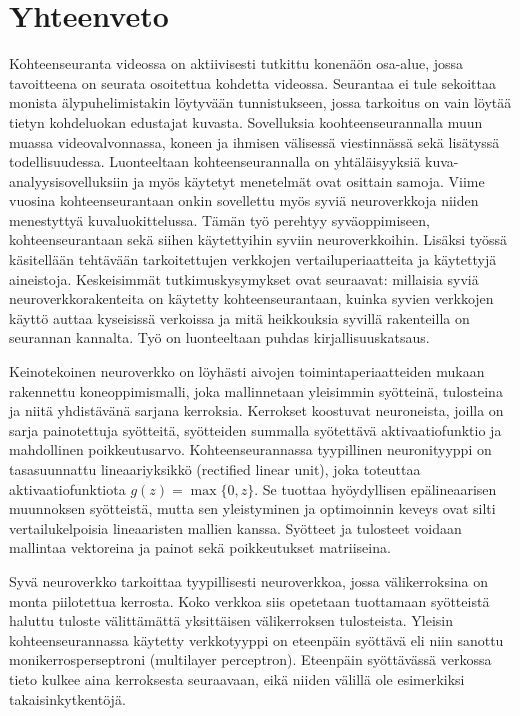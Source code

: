 \clearpage
\section*{Yhteenveto}
Kohteenseuranta videossa on aktiivisesti tutkittu konenäön osa-alue, jossa tavoitteena
on seurata osoitettua kohdetta videossa. Seurantaa ei tule sekoittaa monista älypuhelimistakin
löytyvään tunnistukseen, jossa tarkoitus on vain löytää tietyn kohdeluokan edustajat
kuvasta. Sovelluksia koohteenseurannalla muun muassa videovalvonnassa, koneen ja ihmisen
välisessä viestinnässä sekä lisätyssä todellisuudessa. Luonteeltaan kohteenseurannalla on
yhtäläisyyksiä kuva-analyysisovelluksiin ja myös käytetyt menetelmät ovat osittain samoja.
Viime vuosina kohteenseurantaan onkin sovellettu myös syviä neuroverkkoja niiden menestyttyä
kuvaluokittelussa. Tämän työ perehtyy syväoppimiseen, kohteenseurantaan sekä siihen
käytettyihin syviin neuroverkkoihin. Lisäksi työssä käsitellään tehtävään tarkoitettujen
verkkojen vertailuperiaatteita ja käytettyjä aineistoja. Keskeisimmät tutkimuskysymykset
ovat seuraavat: millaisia syviä neuroverkkorakenteita on käytetty kohteenseurantaan, kuinka
syvien verkkojen käyttö auttaa kyseisissä verkoissa ja mitä heikkouksia syvillä rakenteilla
on seurannan kannalta. Työ on luonteeltaan puhdas kirjallisuuskatsaus.

Keinotekoinen neuroverkko on löyhästi aivojen toimintaperiaatteiden mukaan rakennettu
koneoppimismalli, joka mallinnetaan yleisimmin syötteinä, tulosteina ja niitä yhdistävänä
sarjana kerroksia. Kerrokset koostuvat neuroneista, joilla on sarja painotettuja syötteitä,
syötteiden summalla syötettävä aktivaatiofunktio ja mahdollinen poikkeutusarvo. Kohteenseurannassa
tyypillinen neuronityyppi on tasasuunnattu lineaariyksikkö (rectified linear unit), joka
toteuttaa aktivaatiofunktiota $g (z) = \max\{0,z\}$. Se tuottaa hyöydyllisen epälineaarisen
muunnoksen syötteistä, mutta sen yleistyminen ja optimoinnin keveys ovat silti vertailukelpoisia
lineaaristen mallien kanssa. Syötteet ja tulosteet voidaan mallintaa vektoreina ja painot sekä
poikkeutukset matriiseina.

Syvä neuroverkko tarkoittaa tyypillisesti neuroverkkoa, jossa välikerroksina on monta
piilotettua kerrosta. Koko verkkoa siis opetetaan tuottamaan syötteistä haluttu tuloste
välittämättä yksittäisen välikerroksen tulosteista. Yleisin kohteenseurannassa käytetty
verkkotyyppi on eteenpäin syöttävä eli niin sanottu monikerrosperseptroni (multilayer
perceptron). Eteenpäin syöttävässä verkossa tieto kulkee aina kerroksesta seuraavaan,
eikä niiden välillä ole esimerkiksi takaisinkytkentöjä.

